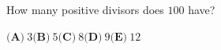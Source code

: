 How many positive divisors does $100$ have?

$\textbf{(A)}\ 3$\qquad$\textbf{(B)}\ 5$\qquad$\textbf{(C)}\ 8$\qquad$\textbf{(D)}\ 9$\qquad$\textbf{(E)}\ 12$

